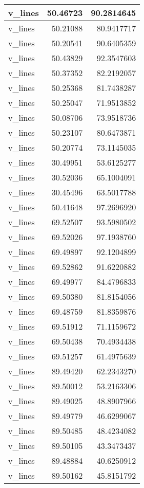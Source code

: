 \documentclass[
]{book}
\theoremstyle{definition}
\theoremstyle{definition}
\theoremstyle{definition}
\theoremstyle{definition}
\theoremstyle{remark}
\begin{document}
\begin{tabular}{l|r|r}
\hline
v\_lines & 50.46723 & 90.2814645\\
\hline
v\_lines & 50.21088 & 80.9417717\\
\hline
v\_lines & 50.20541 & 90.6405359\\
\hline
v\_lines & 50.43829 & 92.3547603\\
\hline
v\_lines & 50.37352 & 82.2192057\\
\hline
v\_lines & 50.25368 & 81.7438287\\
\hline
v\_lines & 50.25047 & 71.9513852\\
\hline
v\_lines & 50.08706 & 73.9518736\\
\hline
v\_lines & 50.23107 & 80.6473871\\
\hline
v\_lines & 50.20774 & 73.1145035\\
\hline
v\_lines & 30.49951 & 53.6125277\\
\hline
v\_lines & 30.52036 & 65.1004091\\
\hline
v\_lines & 30.45496 & 63.5017788\\
\hline
v\_lines & 50.41648 & 97.2696920\\
\hline
v\_lines & 69.52507 & 93.5980502\\
\hline
v\_lines & 69.52026 & 97.1938760\\
\hline
v\_lines & 69.49897 & 92.1204899\\
\hline
v\_lines & 69.52862 & 91.6220882\\
\hline
v\_lines & 69.49977 & 84.4796833\\
\hline
v\_lines & 69.50380 & 81.8154056\\
\hline
v\_lines & 69.48759 & 81.8359876\\
\hline
v\_lines & 69.51912 & 71.1159672\\
\hline
v\_lines & 69.50438 & 70.4934438\\
\hline
v\_lines & 69.51257 & 61.4975639\\
\hline
v\_lines & 89.49420 & 62.2343270\\
\hline
v\_lines & 89.50012 & 53.2163306\\
\hline
v\_lines & 89.49025 & 48.8907966\\
\hline
v\_lines & 89.49779 & 46.6299067\\
\hline
v\_lines & 89.50485 & 48.4234082\\
\hline
v\_lines & 89.50105 & 43.3473437\\
\hline
v\_lines & 89.48884 & 40.6250912\\
\hline
v\_lines & 89.50162 & 45.8151792\\

\end{tabular}
\end{document}
